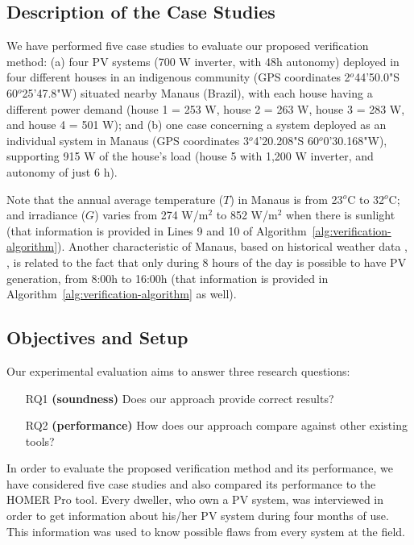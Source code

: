 \documentclass[journal]{IEEEtran}
\begin{document}
\subsection{Description of the Case Studies}

We have performed five case studies to evaluate our proposed verification method: (a) four PV systems (700 W inverter, with 48h autonomy) deployed in four different houses in an indigenous community (GPS coordinates 2$^{o}$44'50.0"S 60$^{o}$25'47.8"W) situated nearby Manaus (Brazil), with each house having a different power demand (house 1 = 253 W, house 2 = 263 W, house 3 = 283 W, and house 4 = 501 W); and (b) one case concerning a system deployed as an individual system in Manaus (GPS coordinates 3$^{o}$4'20.208"S 60$^{o}$0'30.168"W), supporting 915 W of the house's load (house 5 with 1,200 W inverter, and autonomy of just 6 h). 

Note that the annual average temperature ($T$) in Manaus is from 23$^{o}$C to 32$^{o}$C; and irradiance ($G$) varies from 274 W/m$^{2}$ to 852 W/m$^{2}$ when there is sunlight (that information is provided in Lines 9 and 10 of Algorithm~\ref{alg:verification-algorithm}). Another characteristic of Manaus, based on historical weather data \cite{Temperature}, \cite{Irradiance}, is related to the fact that only during 8 hours of the day is possible to have PV generation, from 8:00h to 16:00h (that information is provided in Algorithm~\ref{alg:verification-algorithm} as well).


\subsection{Objectives and Setup}
Our experimental evaluation aims to answer three research questions:
%
\begin{enumerate}
\item[RQ1] \textbf{(soundness)} Does our approach provide correct results?
\item[RQ2] \textbf{(performance)} How does our approach compare against other existing tools?
\end{enumerate}

In order to evaluate the proposed verification method and its performance, we have considered five case studies and also compared its performance to the HOMER Pro tool. Every dweller, who own a PV system, was interviewed in order to get information about his/her PV system during four months of use. This information was used to know possible flaws from every system at the field.
\end{document}
